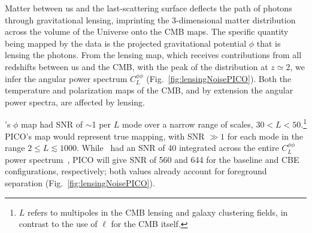 \documentclass[PICOReport.tex]{subfiles}
\begin{document}




\vspace{0.1in}
 \hspace{0.1in} \label{gravitationallensing}
Matter between us and the last-scattering surface deflects the path of photons through gravitational lensing, imprinting the 3-dimensional matter distribution across the volume of the Universe onto the CMB maps. The specific quantity being mapped by the data is the projected gravitational potential $\phi$ that is lensing the photons. From the lensing map, which receives contributions from all redshifts between us and the CMB, with the peak of the distribution at $z \simeq 2$, we infer the angular power spectrum $C_{L}^{\phi \phi}$ (Fig.~\ref{fig:lensingNoisePICO}). %
Both the temperature and polarization maps of the CMB, and by extension the angular power spectra, are affected by lensing. 

\planck 's $\phi$ map had \ac{SNR} of $\sim$1 per $L$ mode over a narrow range of scales, $30 < L < 50$.\footnote{$L$ refers to multipoles in the CMB lensing and galaxy clustering fields, in contrast to the use of $\ell$  for the CMB itself. } PICO's map would represent true mapping, with \ac{SNR} $\gg1$ for each mode in the range $2 \leq L \lesssim 1000$.  
While \planck\ had an \ac{SNR} of 40 integrated across the entire $C_{L}^{\phi \phi}$ power spectrum~\citep{2018arXiv180706210P}, PICO will give \ac{SNR} of 560 and 644 for the baseline and CBE configurations, respectively; both values already account for foreground separation (Fig.~\ref{fig:lensingNoisePICO}). 
\end{document}
